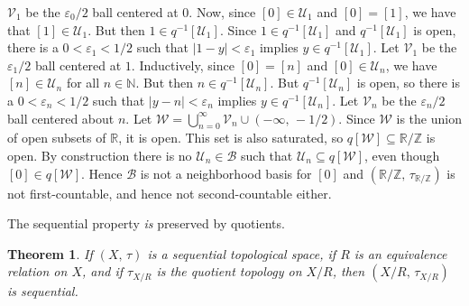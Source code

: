 \documentclass{article}
\theoremstyle{plain}
\newtheorem{theorem}{Theorem}[section]
\theoremstyle{normal}
\begin{document}
        $\mathcal{V}_{1}$ be the $\varepsilon_{0}/2$ ball centered at 0. Now,
        since $[0]\in\mathcal{U}_{1}$ and $[0]=[1]$, we have that
        $[1]\in\mathcal{U}_{1}$. But then $1\in{q}^{-1}[\mathcal{U}_{1}]$. Since
        $1\in{q}^{-1}[\mathcal{U}_{1}]$ and
        $q^{-1}[\mathcal{U}_{1}]$ is open, there is a $0<\varepsilon_{1}<1/2$
        such that $|1-y|<\varepsilon_{1}$ implies
        $y\in{q}^{-1}[\mathcal{U}_{1}]$. Let $\mathcal{V}_{1}$ be the
        $\varepsilon_{1}/2$ ball centered at $1$. Inductively, since
        $[0]=[n]$ and $[0]\in\mathcal{U}_{n}$, we have
        $[n]\in\mathcal{U}_{n}$ for all $n\in\mathbb{N}$. But then
        $n\in{q}^{-1}[\mathcal{U}_{n}]$. But $q^{-1}[\mathcal{U}_{n}]$ is open,
        so there is a $0<\varepsilon_{n}<1/2$ such that $|y-n|<\varepsilon_{n}$
        implies $y\in{q}^{-1}[\mathcal{U}_{n}]$. Let
        $\mathcal{V}_{n}$ be the $\varepsilon_{n}/2$ ball centered about $n$.
        Let
        $\mathcal{W}=\bigcup_{n=0}^{\infty}\mathcal{V}_{n}\cup(-\infty,\,-1/2)$. Since
        $\mathcal{W}$ is the union of open subsets of $\mathbb{R}$, it is open.
        This set is also saturated, so
        $q[\mathcal{W}]\subseteq\mathbb{R}/\mathbb{Z}$ is open. By construction
        there is no $\mathcal{U}_{n}\in\mathcal{B}$ such that
        $\mathcal{U}_{n}\subseteq{q}[\mathcal{W}]$, even though
        $[0]\in{q}[\mathcal{W}]$. Hence $\mathcal{B}$ is not a neighborhood
        basis for $[0]$ and
        $(\mathbb{R}/\mathbb{Z},\,\tau_{\mathbb{R}/\mathbb{Z}})$ is not
        first-countable, and hence not second-countable either.
        \par\hfill\par
        The sequential property \textit{is} preserved by quotients.
        \begin{theorem}
            If $(X,\,\tau)$ is a sequential topological space, if
            $R$ is an equivalence relation on $X$, and if
            $\tau_{X/R}$ is the quotient topology on $X/R$, then
            $(X/R,\,\tau_{X/R})$ is sequential.
        \end{theorem}
\end{document}
